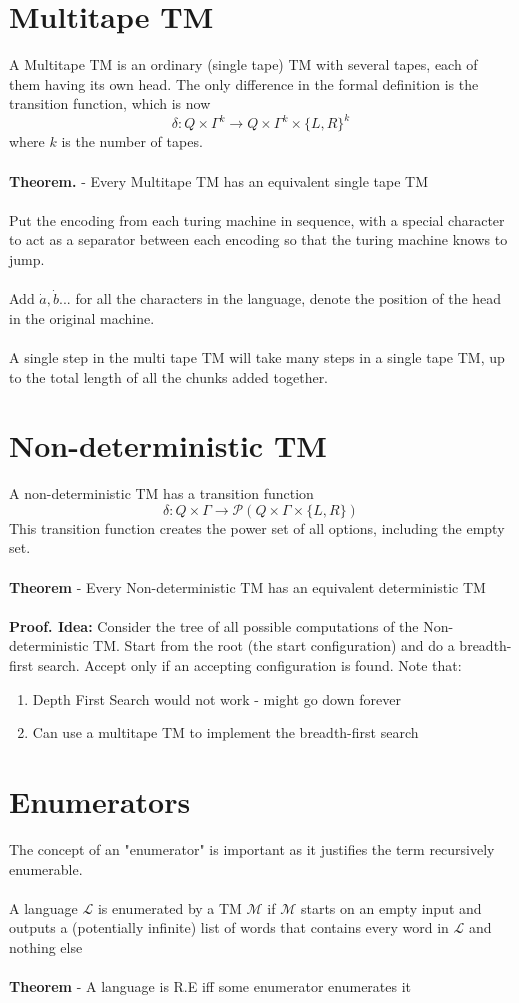 \documentclass{article}[18pt]
\begin{document}
\section{Multitape TM}
A Multitape TM is an ordinary (single tape) TM with several tapes, each of them having its own head. The only difference in the formal definition is the transition function, which is now
$$\delta: Q \times \Gamma^{k} \rightarrow Q \times \Gamma^{k} \times\{L, R\}^{k}$$
where $k$ is the number of tapes.\\
\\
\textbf{Theorem.} - Every Multitape TM has an equivalent single tape TM\\
\\
Put the encoding from each turing machine in sequence, with a special character to act as a separator between each encoding so that the turing machine knows to jump.\\
\\
Add $\dot{a},\dot{b}...$ for all the characters in the language, denote the position of the head in the original machine.\\
\\
A single step in the multi tape TM will take many steps in a single tape TM, up to the total length of all the chunks added together.
\section{Non-deterministic TM}
A non-deterministic TM has a transition function
$$\delta: Q \times \Gamma \rightarrow \mathscr{P}(Q \times \Gamma \times\{L, R\})$$
This transition function creates the power set of all options, including the empty set.\\
\\
\textbf{Theorem} - Every Non-deterministic TM has an equivalent deterministic TM\\
\\
\textbf{Proof. Idea:} Consider the tree of all possible computations of the Non-deterministic TM. Start from the root (the start configuration) and do a breadth-first search.  Accept only if an accepting configuration is found. Note that:
\begin{enumerate}
	\item Depth First Search would not work - might go down forever
	\item Can use a multitape TM to implement the breadth-first search
\end{enumerate}
\section{Enumerators}
The concept of an "enumerator" is important as it justifies the term recursively enumerable.\\
\\
A language $\mathscr{L}$ is enumerated by a TM $\mathscr{M}$ if $\mathscr{M}$ starts on an empty input and outputs a (potentially infinite) list of words that contains every word in $\mathscr{L}$ and nothing else\\
\\
\textbf{Theorem} - A language is R.E iff some enumerator enumerates it
\end{document}
